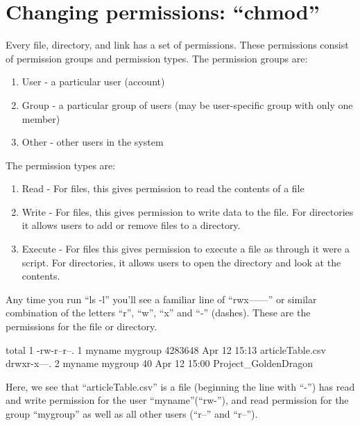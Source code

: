 \begin{prompt}
\end{prompt}

\section{Changing permissions: ``chmod''}

Every file, directory, and link has a set of permissions. These permissions
consist of permission groups and permission types. The permission groups are: 

\begin{enumerate}
\item User - a particular user (account)
\item Group - a particular group of users (may be user-specific group with only one member)
\item Other - other users in the system
\end{enumerate}

The permission types are:

\begin{enumerate}
\item Read - For files, this gives permission to read the contents of a file
\item Write - For files, this gives permission to write data to the file. For directories it allows users to add or remove files to a directory.
\item Execute - For files this gives permission to execute a file as through it were a script. For directories, it allows users to open the directory and look at the contents.
\end{enumerate}

Any time you run ``ls -l'' you'll see a familiar line of ``rwx------'' or similar combination of the letters ``r'', ``w'', ``x'' and ``-'' (dashes). These are the permissions for the file or directory.

\begin{prompt}
    total 1
    -rw-r--r--. 1 myname mygroup 4283648 Apr 12 15:13 articleTable.csv
    drwxr-x---. 2 myname mygroup      40 Apr 12 15:00 Project_GoldenDragon
\end{prompt}

Here, we see that ``articleTable.csv'' is a file (beginning the line with ``-'') has read and write permission for the user ``myname''(``rw-''), and read permission for the group ``mygroup'' as well as all other users (``r--'' and ``r--'').


